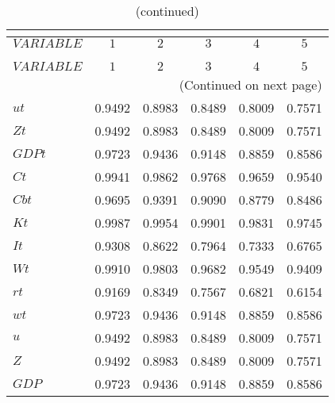  
\begin{center}
\begin{longtable}{lccccc} 
\caption{AUTOCORRELATION OF SIMULATED VARIABLES}\\
 \label{Table:sim_autocorr_matrix}\\
\toprule 
$VARIABLE  $	 & 	 $         1$	 & 	 $         2$	 & 	 $         3$	 & 	 $         4$	 & 	 $         5$\\
\midrule \endfirsthead 
\caption{(continued)}\\
 \toprule \\ 
$VARIABLE  $	 & 	 $         1$	 & 	 $         2$	 & 	 $         3$	 & 	 $         4$	 & 	 $         5$\\
\midrule \endhead 
\midrule \multicolumn{6}{r}{(Continued on next page)} \\ \bottomrule \endfoot 
\bottomrule \endlastfoot 
$ut        $	 & 	    0.9492	 & 	    0.8983	 & 	    0.8489	 & 	    0.8009	 & 	    0.7571 \\ 
$Zt        $	 & 	    0.9492	 & 	    0.8983	 & 	    0.8489	 & 	    0.8009	 & 	    0.7571 \\ 
$GDPt      $	 & 	    0.9723	 & 	    0.9436	 & 	    0.9148	 & 	    0.8859	 & 	    0.8586 \\ 
$Ct        $	 & 	    0.9941	 & 	    0.9862	 & 	    0.9768	 & 	    0.9659	 & 	    0.9540 \\ 
$Cbt       $	 & 	    0.9695	 & 	    0.9391	 & 	    0.9090	 & 	    0.8779	 & 	    0.8486 \\ 
$Kt        $	 & 	    0.9987	 & 	    0.9954	 & 	    0.9901	 & 	    0.9831	 & 	    0.9745 \\ 
$It        $	 & 	    0.9308	 & 	    0.8622	 & 	    0.7964	 & 	    0.7333	 & 	    0.6765 \\ 
$Wt        $	 & 	    0.9910	 & 	    0.9803	 & 	    0.9682	 & 	    0.9549	 & 	    0.9409 \\ 
$rt        $	 & 	    0.9169	 & 	    0.8349	 & 	    0.7567	 & 	    0.6821	 & 	    0.6154 \\ 
$wt        $	 & 	    0.9723	 & 	    0.9436	 & 	    0.9148	 & 	    0.8859	 & 	    0.8586 \\ 
$u         $	 & 	    0.9492	 & 	    0.8983	 & 	    0.8489	 & 	    0.8009	 & 	    0.7571 \\ 
$Z         $	 & 	    0.9492	 & 	    0.8983	 & 	    0.8489	 & 	    0.8009	 & 	    0.7571 \\ 
$GDP       $	 & 	    0.9723	 & 	    0.9436	 & 	    0.9148	 & 	    0.8859	 & 	    0.8586 \\ 

\end{longtable}
\end{center}
